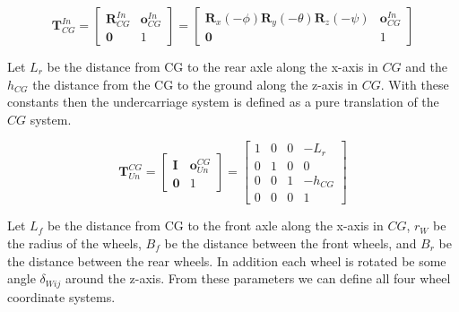 \begin{equation}
  \mathbf{T}_{CG}^{In} = 
  \begin{bmatrix}
    \mathbf{R}_{CG}^{In} & \mathbf{o}_{CG}^{In} \\
    \mathbf{0} & 1
  \end{bmatrix}
  =
  \begin{bmatrix}
    \mathbf{R}_x(-\phi)\mathbf{R}_y(-\theta)\mathbf{R}_z(-\psi) & \mathbf{o}_{CG}^{In} \\
    \mathbf{0} & 1
  \end{bmatrix}
\end{equation}



Let $L_r$ be the distance from CG to the rear axle along the x-axis in $CG$ and the $h_{CG}$ the distance from the CG to the ground along the z-axis in $CG$. 
With these constants then the undercarriage system is defined as a pure translation of the $CG$ system.

\begin{equation}
  \mathbf{T}_{Un}^{CG} = 
  \begin{bmatrix}
    \mathbf{I} & \mathbf{o}_{Un}^{CG} \\
    \mathbf{0} & 1
  \end{bmatrix}
  =
  \begin{bmatrix}
    1 & 0 & 0 & -L_r \\
    0 & 1 & 0 & 0 \\
    0 & 0 & 1 & -h_{CG} \\
    0 & 0 & 0 & 1
  \end{bmatrix}
\end{equation}


Let $L_f$ be the distance from CG to the front axle along the x-axis in $CG$, $r_W$ be the radius of the wheels, $B_f$ be the distance between the front wheels, and $B_r$ be the distance between the rear wheels. In addition each wheel is rotated be some angle $\delta_{Wij}$ around the z-axis. From these parameters we can define all four wheel coordinate systems.


